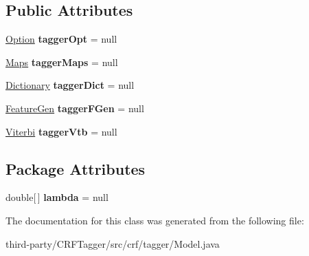 \subsection*{Public Attributes}
\begin{DoxyCompactItemize}
\item 
\hypertarget{classcrf_1_1tagger_1_1Model_a193ded2e22b52b5a32f9a61b213a03cd}{
\hyperlink{classcrf_1_1tagger_1_1Option}{Option} {\bfseries taggerOpt} = null}
\label{classcrf_1_1tagger_1_1Model_a193ded2e22b52b5a32f9a61b213a03cd}

\item 
\hypertarget{classcrf_1_1tagger_1_1Model_aa4ffc23c3a0944f730fa341321105404}{
\hyperlink{classcrf_1_1tagger_1_1Maps}{Maps} {\bfseries taggerMaps} = null}
\label{classcrf_1_1tagger_1_1Model_aa4ffc23c3a0944f730fa341321105404}

\item 
\hypertarget{classcrf_1_1tagger_1_1Model_a184ed87dd3ac89f8185cb3ea196eaade}{
\hyperlink{classcrf_1_1tagger_1_1Dictionary}{Dictionary} {\bfseries taggerDict} = null}
\label{classcrf_1_1tagger_1_1Model_a184ed87dd3ac89f8185cb3ea196eaade}

\item 
\hypertarget{classcrf_1_1tagger_1_1Model_a4cdc49a163f63dd926d50ce2bd72a881}{
\hyperlink{classcrf_1_1tagger_1_1FeatureGen}{FeatureGen} {\bfseries taggerFGen} = null}
\label{classcrf_1_1tagger_1_1Model_a4cdc49a163f63dd926d50ce2bd72a881}

\item 
\hypertarget{classcrf_1_1tagger_1_1Model_ab36b5ac7fa5207f2b07a261b12d44d1d}{
\hyperlink{classcrf_1_1tagger_1_1Viterbi}{Viterbi} {\bfseries taggerVtb} = null}
\label{classcrf_1_1tagger_1_1Model_ab36b5ac7fa5207f2b07a261b12d44d1d}

\end{DoxyCompactItemize}
\subsection*{Package Attributes}
\begin{DoxyCompactItemize}
\item 
\hypertarget{classcrf_1_1tagger_1_1Model_a68cbf1a3572dc75aef5300f2afed15b0}{
double\mbox{[}$\,$\mbox{]} {\bfseries lambda} = null}
\label{classcrf_1_1tagger_1_1Model_a68cbf1a3572dc75aef5300f2afed15b0}

\end{DoxyCompactItemize}


The documentation for this class was generated from the following file:\begin{DoxyCompactItemize}
\item 
third-\/party/CRFTagger/src/crf/tagger/Model.java\end{DoxyCompactItemize}
